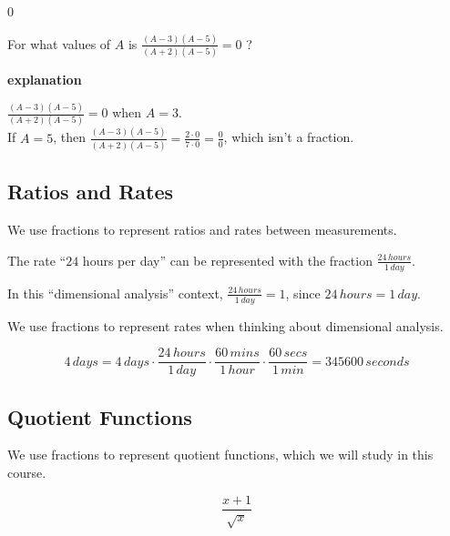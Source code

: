 \documentclass{ximera}
\begin{document}
\begin{example} $0$


For what values of $A$ is  $\frac{(A-3)(A-5)}{(A+2)(A-5)} = 0$ ?


\textbf{\textcolor{red!75!green}{explanation}} 

$\frac{(A-3)(A-5)}{(A+2)(A-5)} = 0$ when $A = 3$. \\


If $A = 5$, then $\frac{(A-3)(A-5)}{(A+2)(A-5)} = \frac{2\cdot0}{7\cdot0} = \frac{0}{0}$, which isn't a fraction.






\end{example}




\subsection*{Ratios and Rates}

\hfill\break


We use fractions to represent ratios and rates between measurements. 




The rate  ``$24$ hours per day'' can be represented with the fraction $\frac{24 \, hours}{1 \, day}$. 



In this ``dimensional analysis'' context, $\frac{24 \, hours}{1 \, day} = 1$, since $24 \, hours = 1 \, day$. 


We use fractions to represent rates when thinking about dimensional analysis. 





\[
4 \, days = 4 \, days \cdot \frac{24 \, hours}{1 \, day} \cdot \frac{60 \, mins}{1 \, hour} \cdot \frac{60 \, secs}{1 \, min} = 345600 \, seconds
\]






\subsection*{Quotient Functions}

\hfill\break


We use fractions to represent quotient functions, which we will study in this course. 




\[
\frac{x+1}{\sqrt{x}}
\]
\end{document}
